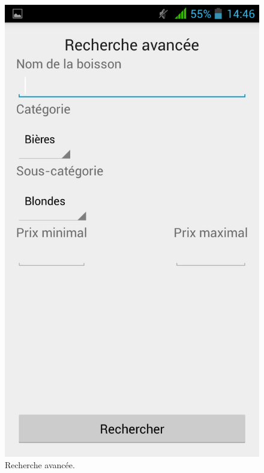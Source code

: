 \begin{figure}[H]
	\centering
	\includegraphics[scale=0.15]{img/search.png}
	\caption{Recherche avancée.}
	\label{fig:search}
\end{figure}


